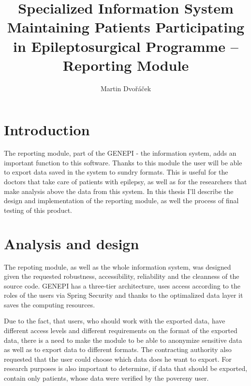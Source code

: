 \documentclass[thesis=B,english]{FITthesis}[2012/10/20]
\title{Specialized Information System Maintaining Patients Participating in Epileptosurgical Programme – Reporting Module}
\author{Martin Dvořáček} %
\begin{document}

\chapter{Introduction}
The reporting module, part of the GENEPI - the information system, adds an important function to this software. Thanks to this module the user will be able to export data saved in the system to sundry formats. This is useful for the doctors that take care of patients with epilepsy, as well as for the researchers that make analysis above the data from this system. In this thesis I'll describe the design and implementation of the reporting module, as well the process of final testing of this product.

\chapter{Analysis and design}
The repoting module, as well as the whole information system, was designed given the requested robustness, accessibility, reliability and the cleanness of the source code. GENEPI has a three-tier architecture, uses access according to the roles of the users via Spring Security and thanks to the optimalized data layer it saves the computing resources.

Due to the fact, that users, who should work with the exported data, have different access levels and different requirements on the format of the exported data, there is a need to make the module to be able to anonymize sensitive data as well as to export data to different formats. The contracting authority also requested that the user could choose which data does he want to export. For research purposes is also important to determine, if data that should be exported, contain only patients, whose data were verified by the povereny user.
\end{document}
